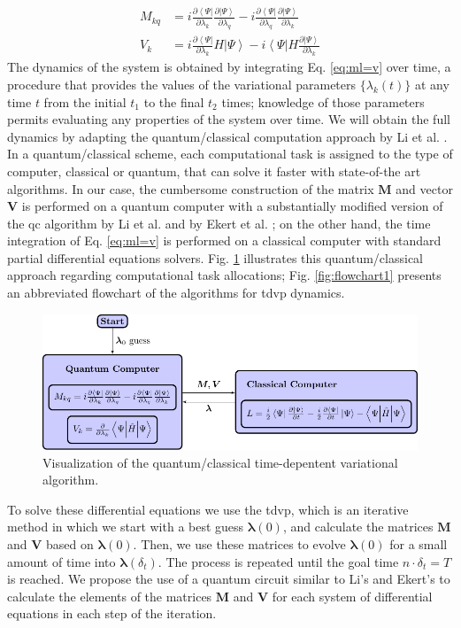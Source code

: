 \documentclass{aux/ttuthes2007}
\newcommand{\bra}[1]{\ensuremath{\left\langle#1\right\vert}}
\newcommand{\ket}[1]{\ensuremath{\left|#1\right\rangle}}
\newcommand{\kpp}[1]{\frac{\partial \ket\Psi}{\partial #1}}
\newcommand{\bpp}[1]{\frac{\partial \bra\Psi}{\partial #1}}
\begin{document}
%
\begin{equation*}
	\begin{split}
		M_{kq} &= i\bpp{\lambda_k} \kpp{\lambda_q} - i\bpp{\lambda_q} \kpp{\lambda_k} \\
		V_{k} &= i\bpp{\lambda_k} H \ket \Psi - i\bra \Psi H \kpp{\lambda_k} 
	\end{split}
\end{equation*}
%
The dynamics of the system is obtained by integrating Eq. \ref{eq:ml=v} over time, a procedure that provides the values of the variational parameters $\{\lambda_k(t)\}$ at any time $t$ from the initial $t_1$ to the final $t_2$ times;
knowledge of those parameters permits evaluating any properties of the system over time.
We will obtain the full dynamics by adapting the quantum/classical computation approach by Li et al. .
In a quantum/classical scheme, each computational task is assigned to the type of computer, classical or quantum, that can solve it faster with state-of-the art algorithms.
In our case, the cumbersome construction of the matrix $\bm M$ and vector $\bm V$ is performed on a quantum computer with a substantially modified version of the \gls{qc} algorithm by Li et al.  and by Ekert et al. ;
on the other hand, the time integration of Eq. \ref{eq:ml=v} is performed on a classical computer with standard partial differential equations solvers.
Fig. \ref{fig:TDVP} illustrates this quantum/classical approach regarding computational task allocations;
Fig. \ref{fig:flowchart1} presents an abbreviated flowchart of the algorithms for \gls{tdvp} dynamics.
%
\begin{figure}
	\centering
  \includegraphics[width=\linewidth]{img/variation_figure.pdf}
  \caption{Visualization of the quantum/classical time-depentent variational algorithm.}
  \label{fig:TDVP}
\end{figure}
%
To solve these differential equations we use the \gls{tdvp}, which is an iterative method in which we start with a best guess $\bm \lambda(0)$, and calculate the matrices $\bm M$ and $\bm V$ based on $\bm \lambda(0)$.
Then, we use these matrices to evolve $\bm \lambda(0)$ for a small amount of time into $\bm \lambda(\delta_t)$.
The process is repeated until the goal time $n\cdot\delta_t = T$ is reached.
We propose the use of a quantum circuit similar to Li's \cite{benjamin} and Ekert's  to calculate the elements of the matrices $\bm M$ and $\bm V$ for each system of differential equations in each step of the iteration.
\end{document}
